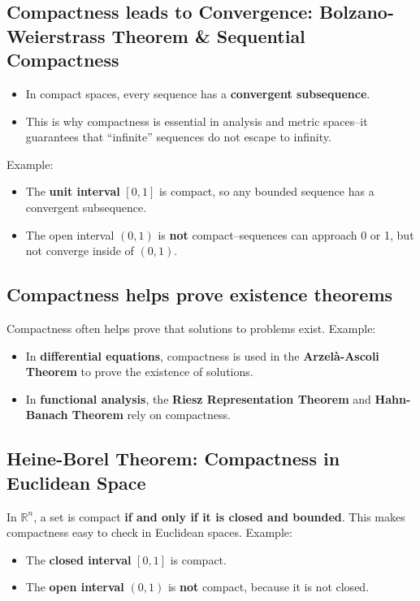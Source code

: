 \documentclass{article}
\begin{document}
\subsection{Compactness leads to Convergence: Bolzano-Weierstrass Theorem \& Sequential Compactness}
\begin{itemize}
    \item In compact spaces, every sequence has a \textbf{convergent subsequence}.
    \item This is why compactness is essential in analysis and metric spaces--it guarantees that ``infinite''
    sequences do not escape to infinity.
\end{itemize}
Example:
\begin{itemize}
    \item The \textbf{unit interval} $[0, 1]$ is compact, so any bounded sequence has a convergent subsequence.
    \item The open interval $(0, 1)$ is \textbf{not} compact--sequences can approach 0 or 1, but not converge
    inside of $(0, 1)$.
\end{itemize}


\subsection{Compactness helps prove existence theorems}
Compactness often helps prove that solutions to problems exist.
Example:
\begin{itemize}
    \item In \textbf{differential equations}, compactness is used in the \textbf{Arzel\`{a}-Ascoli Theorem} to prove
    the existence of solutions.
    \item In \textbf{functional analysis}, the \textbf{Riesz Representation Theorem} and \textbf{Hahn-Banach Theorem}
    rely on compactness.
\end{itemize}

\subsection{Heine-Borel Theorem: Compactness in Euclidean Space}
In $\mathbb{R}^n$, a set is compact \textbf{if and only if it is closed and bounded}. This makes 
compactness easy to check in Euclidean spaces.
Example:
\begin{itemize}
    \item The \textbf{closed interval} $[0, 1]$ is compact.
    \item The \textbf{open interval} $(0, 1)$ is \textbf{not} compact, because it is not closed.
\end{itemize}
\end{document}
